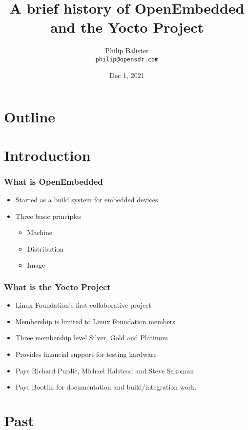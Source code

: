 \documentclass{beamer}
\title{A brief history of OpenEmbedded and the Yocto Project}
\institute{Open SDR}
\author{Philip Balister \\
\tt\tiny philip@opensdr.com}
\date{Dec 1, 2021}
\begin{document}
 

\begin{frame}
\titlepage
\end{frame}

\section*{Outline}

\begin{frame}
  \tableofcontents
\end{frame}

\section{Introduction}

\begin{frame}
\frametitle{What is OpenEmbedded}

\begin{itemize}
\item Started as a build system for embedded devices
\item Three basic principles
	\begin{itemize}
		\item{Machine}
		\item{Distribution}
		\item{Image}
	\end{itemize}
\end{itemize}

\end{frame}

\begin{frame}
\frametitle{What is the Yocto Project}

\begin{itemize}
\item Linux Foundation's first collaborative project
\item Membership is limited to Linux Foundation members
\item Three membership level Silver, Gold and Platinum
\item Provides financial support for testing hardware
\item Pays Richard Purdie, Michael Halstead and Steve Sakoman
\item Pays Bootlin for documentation and build/integration work. 
\end{itemize}

\end{frame}

\section{Past}
\end{document}
